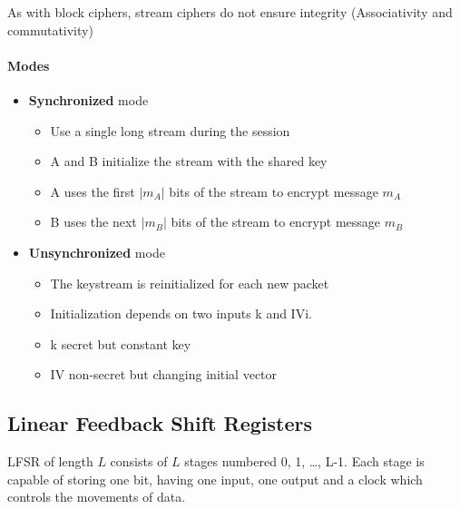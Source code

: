 \begin{center}
    \end{center}

As with block ciphers, stream ciphers do not ensure integrity (Associativity
and commutativity)

\paragraph{Modes}
\begin{itemize}
    \item \textbf{Synchronized} mode
    \begin{itemize}
        \item Use a single long stream during the session
        \item A and B initialize the stream with the shared key
        \item A uses the first $|m_A|$ bits of the stream to encrypt message
        $m_A$
        \item B uses the next $|m_B|$ bits of the stream to encrypt message
        $m_B$
    \end{itemize}

\item \textbf{Unsynchronized} mode
    \begin{itemize}
        \item The keystream is reinitialized for each new packet
        \item Initialization depends on two inputs k and IVi\@.
        \item k secret but constant key
        \item IV non-secret but changing initial vector
    \end{itemize}
\end{itemize}

\subsection{Linear Feedback Shift Registers}
LFSR of length $L$ consists of $L$ stages numbered 0, 1, \ldots, L-1. 
Each stage is capable of storing one bit, having one input, one output and a
clock which controls the movements of data.

